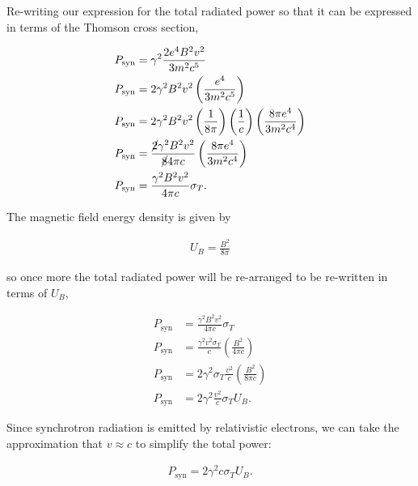 \documentclass[12pt]{article}
\begin{document}
Re-writing our expression for the total radiated power so that it can be expressed in terms of the Thomson cross section,

\begin{equation*}
\begin{split}
    P_\mathrm{syn} &= \gamma^2 \frac{2e^4B^2v^2}{3m^2c^5} \\
    P_\mathrm{syn} &= 2\gamma^2 B^2v^2 \left(\frac{e^4}{3m^2c^5}\right) \\
    P_\mathrm{syn} &= 2\gamma^2 B^2v^2 \left(\frac{1}{8\pi}\right) \left(\frac{1}{c}\right) \left(\frac{8\pi e^4}{3m^2c^4}\right) \\
    P_\mathrm{syn} &= \frac{\cancel{2}\gamma^2 B^2v^2}{\cancel{8}4\pi c} \left(\frac{8\pi e^4}{3m^2c^4}\right) \\
    P_\mathrm{syn} &= \frac{\gamma^2 B^2v^2}{4\pi c} \sigma_T.
\end{split}
\end{equation*}

The magnetic field energy density is given by 

\begin{align*}
    U_B = \frac{B^2}{8\pi}
\end{align*}

{\noindent}so once more the total radiated power will be re-arranged to be re-written in terms of $U_B$,

\begin{equation*}
\begin{split}
    P_\mathrm{syn} &= \frac{\gamma^2 B^2v^2}{4\pi c} \sigma_T \\
    P_\mathrm{syn} &= \frac{\gamma^2 v^2\sigma_T}{c} \left(\frac{B^2}{4\pi c}\right) \\
    P_\mathrm{syn} &= 2\gamma^2\sigma_T \frac{v^2}{c} \left(\frac{B^2}{8\pi c}\right) \\
    P_\mathrm{syn} &= 2\gamma^2 \frac{v^2}{c} \sigma_T U_B.
\end{split}
\end{equation*}

{\noindent}Since synchrotron radiation is emitted by relativistic electrons, we can take the approximation that $v \approx c$ to simplify the total power:

\begin{align*}
    \boxed{P_\mathrm{syn} = 2\gamma^2 c\sigma_T U_B}.
\end{align*}

\end{document}
